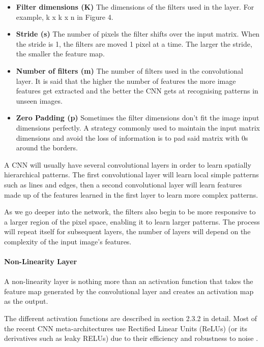 \documentclass{article}
\begin{document}
\begin{itemize}
    \item \textbf{Filter dimensions (K)} The dimensions of the filters used in the layer. For example, k x k x n in Figure 4.
    \item \textbf{Stride (s)} The number of pixels the filter shifts over the input matrix. When the stride is 1, the filters are moved 1 pixel at a time. The larger the stride, the smaller the feature map.
    \item \textbf{Number of filters (m)} The number of filters used in the convolutional layer. It is said that the higher the number of features the more image features get extracted and the better the CNN gets at recognising patterns in unseen images.
    \item \textbf{Zero Padding (p)} Sometimes the filter dimensions don't fit the image input dimensions perfectly. A strategy commonly used to maintain the input matrix dimensions and avoid the loss of information is to pad said matrix with 0s around the borders.
\end{itemize}

A CNN will usually have several convolutional layers in order to learn spatially hierarchical patterns. The first convolutional layer will learn local simple patterns such as lines and edges, then a second convolutional layer will learn features made up of the features learned in the first layer to learn more complex patterns. 

As we go deeper into the network, the filters also begin to be more responsive to a larger region of the pixel space, enabling it to learn larger patterns. The process will repeat itself for subsequent layers, the number of layers will depend on the complexity of the input image's features.

\paragraph{Non-Linearity Layer}
\paragraph{}
A non-linearity layer is nothing more than an activation function that takes the feature map generated by the convolutional layer and creates an activation map as the output. 

The different activation functions are described in section 2.3.2 in detail. Most of the recent CNN meta-architectures use Rectified Linear Units (ReLUs) (or its derivatives such as leaky RELUs) due to their efficiency and robustness to noise \cite{he2015delving}.
\end{document}
